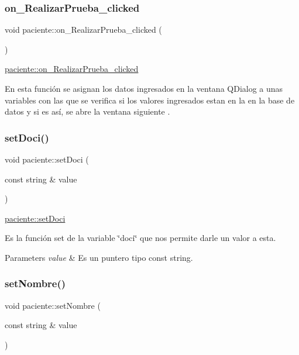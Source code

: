 \subsubsection{\texorpdfstring{on\+\_\+\+Realizar\+Prueba\+\_\+clicked}{on\_RealizarPrueba\_clicked}}
{\footnotesize\ttfamily void paciente\+::on\+\_\+\+Realizar\+Prueba\+\_\+clicked (\begin{DoxyParamCaption}{ }\end{DoxyParamCaption})\hspace{0.3cm}{\ttfamily [slot]}}



\hyperlink{classpaciente_a6d34393d2eb8c21d66135346651a4995}{paciente\+::on\+\_\+\+Realizar\+Prueba\+\_\+clicked} 

En esta función se asignan los datos ingresados en la ventana Q\+Dialog a unas variables con las que se verifica si los valores ingresados estan en la en la base de datos y si es así, se abre la ventana siguiente . \mbox{\label{classpaciente_a98b1eb1d2344fde9ea082722eecd980a}} 
\subsubsection{\texorpdfstring{set\+Doci()}{setDoci()}}
{\footnotesize\ttfamily void paciente\+::set\+Doci (\begin{DoxyParamCaption}\item[{const string \&}]{value }\end{DoxyParamCaption})}



\hyperlink{classpaciente_a98b1eb1d2344fde9ea082722eecd980a}{paciente\+::set\+Doci} 

Es la función set de la variable \char`\"{}doci\char`\"{} que nos permite darle un valor a esta. 
\begin{DoxyParams}{Parameters}
{\em value} & Es un puntero tipo const string. \\
\hline
\end{DoxyParams}
\mbox{\label{classpaciente_aa1c002ee279da1512c06a30ab6f36cf8}} 
\subsubsection{\texorpdfstring{set\+Nombre()}{setNombre()}}
{\footnotesize\ttfamily void paciente\+::set\+Nombre (\begin{DoxyParamCaption}\item[{const string \&}]{value }\end{DoxyParamCaption})}



